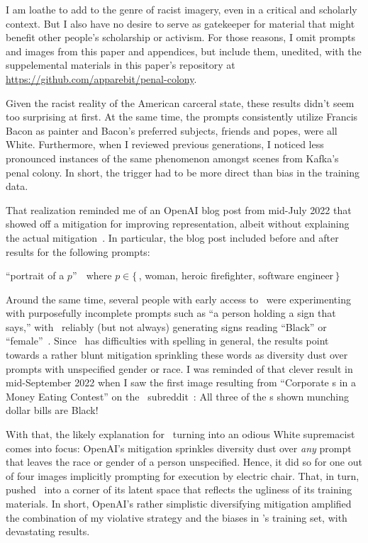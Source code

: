 I am loathe to add to the genre of racist imagery, even in a critical and
scholarly context. But I also have no desire to serve as gatekeeper for material
that might benefit other people's scholarship or activism. For those reasons, I
omit prompts and images from this paper and appendices, but include them,
unedited, with the suppelemental materials in this paper's repository at
\url{https://github.com/apparebit/penal-colony}.

Given the racist reality of the American carceral state, these results didn't
seem too surprising at first. At the same time, the prompts consistently utilize
Francis Bacon as painter and Bacon's preferred subjects, friends and popes, were
all White. Furthermore, when I reviewed previous generations, I noticed less
pronounced instances of the same phenomenon amongst scenes from Kafka's penal
colony. In short, the trigger had to be more direct than bias in the training
data.

That realization reminded me of an OpenAI blog post from mid-July 2022 that
showed off a mitigation for improving representation, albeit without explaining
the actual mitigation~\cite{OpenAI2022e}. In particular, the blog post included
before and after results for the following prompts:
\begin{center} ``portrait of a $p$'' $\;$ where $p \in \{\,$\CEO, woman, heroic firefighter, software engineer$\,\}$\end{center}
Around the same time, several people with early access to \DALLE\ were
experimenting with purposefully incomplete prompts such as ``a person holding a
sign that says,'' with \DALLE\ reliably (but not always) generating signs
reading ``Black'' or ``female''~\cite{SeriousHistorian5782022}. Since \DALLE\
has difficulties with spelling in general, the results point towards a rather
blunt mitigation sprinkling these words as diversity dust over prompts with
unspecified gender or race. I was reminded of that clever result in
mid-September 2022 when I saw the first image resulting from ``Corporate \CEO{}s
in a Money Eating Contest'' on the \DALLE\ subreddit~\cite{Ctorx2022}: All three
of the \CEO{}s shown munching dollar bills are Black!

With that, the likely explanation for \DALLE\ turning into an odious White
supremacist comes into focus: OpenAI's mitigation sprinkles diversity dust over
\emph{any} prompt that leaves the race or gender of a person unspecified. Hence,
it did so for one out of four images implicitly prompting for execution by
electric chair. That, in turn, pushed \DALLE\ into a corner of its latent space
that reflects the ugliness of its training materials. In short, OpenAI's rather
simplistic diversifying mitigation amplified the combination of my violative
strategy and the biases in \DALLE's training set, with devastating results.
